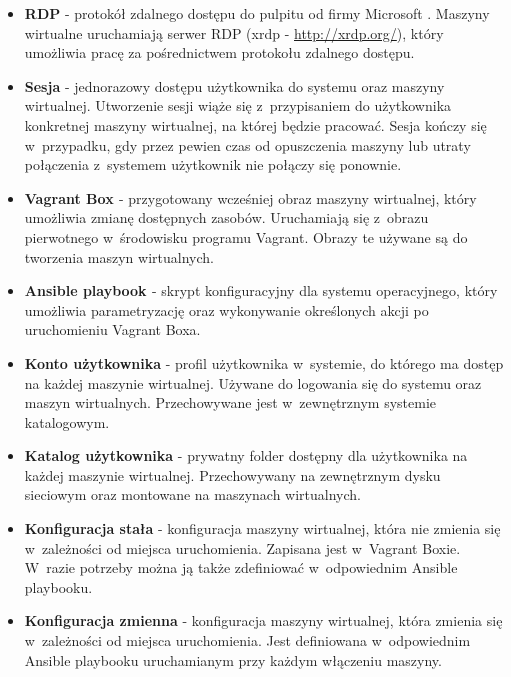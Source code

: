 \documentclass[../wstep.tex]{subfiles}
\begin{document}
\begin{itemize}
  \item \textbf{RDP} - protokół zdalnego dostępu do pulpitu od firmy Microsoft \parencite{rdp}. Maszyny wirtualne uruchamiają serwer RDP (xrdp - \url{http://xrdp.org/}), który umożliwia pracę za pośrednictwem protokołu zdalnego dostępu.
  \item \textbf{Sesja} - jednorazowy dostępu użytkownika do systemu oraz maszyny wirtualnej. Utworzenie sesji wiąże się z~przypisaniem do użytkownika konkretnej maszyny wirtualnej, na której będzie pracować. Sesja kończy się w~przypadku, gdy przez pewien czas od opuszczenia maszyny lub utraty połączenia z~systemem użytkownik nie połączy się ponownie.
  \item \textbf{Vagrant Box \parencite{vagrantbox}} - przygotowany wcześniej obraz maszyny wirtualnej, który umożliwia zmianę dostępnych zasobów. Uruchamiają się z~obrazu pierwotnego w~środowisku programu Vagrant. Obrazy te używane są do tworzenia maszyn wirtualnych.
  \item \textbf{Ansible playbook \parencite{ansible-playbook}} - skrypt konfiguracyjny dla systemu operacyjnego, który umożliwia parametryzację oraz wykonywanie określonych akcji po uruchomieniu Vagrant Boxa.
  
  \item \textbf{Konto użytkownika} - profil użytkownika w~systemie, do którego ma dostęp na każdej maszynie wirtualnej. Używane do logowania się do systemu oraz maszyn wirtualnych. Przechowywane jest w~zewnętrznym systemie katalogowym.
  \item \textbf{Katalog użytkownika} - prywatny folder dostępny dla użytkownika na każdej maszynie wirtualnej. Przechowywany na zewnętrznym dysku sieciowym oraz montowane na maszynach wirtualnych.
  \item \textbf{Konfiguracja stała} - konfiguracja maszyny wirtualnej, która nie zmienia się w~zależności od miejsca uruchomienia. Zapisana jest w~Vagrant Boxie. W~razie potrzeby można ją także zdefiniować w~odpowiednim Ansible playbooku.
  \item \textbf{Konfiguracja zmienna} - konfiguracja maszyny wirtualnej, która zmienia się w~zależności od miejsca uruchomienia. Jest definiowana w~odpowiednim Ansible playbooku uruchamianym przy każdym włączeniu maszyny.
\end{itemize}
\end{document}
